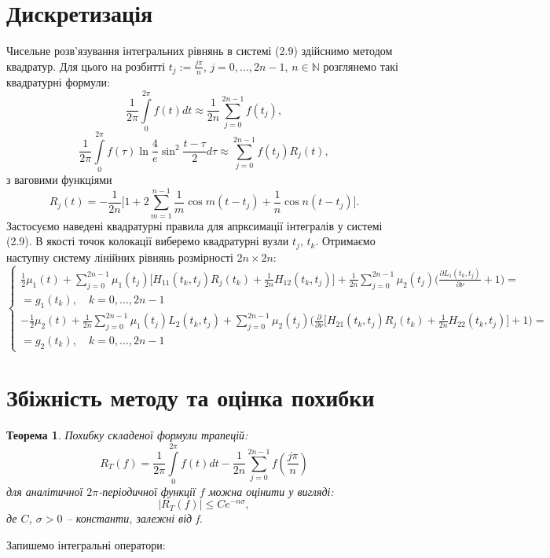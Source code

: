 \documentclass[a4 paper,12pt,ukrainian]{report}
\newtheorem{theorem}{\textbf{Теорема}}[chapter]
\begin{document}
\section{Дискретизація}
\hspace*{\parindent}Чисельне розв'язування інтегральних рівнянь в системі (2.9) здійснимо методом квадратур. Для цього на розбитті $t_{j}:=\frac{j\pi}{n}$, $j=0,...,2n-1$, $n\in\mathbb{N}$ розглянемо такі квадратурні формули:
\begin{equation*}
\displaystyle
\frac{1}{2\pi}\int\limits_{0}^{2\pi}f(t)dt\approx
\frac{1}{2n}\sum\limits_{j=0}^{2n-1}f(t_{j}),
\end{equation*}
\begin{equation*}
\displaystyle
\frac{1}{2\pi}\int\limits_{0}^{2\pi}f(\tau)\ln{\frac{4}{e}\sin^2\frac{t-\tau}{2}}d\tau\approx\sum\limits_{j=0}^{2n-1}f(t_{j})R_{j}(t),
\end{equation*}
з ваговими функціями
\begin{equation*}
\displaystyle
R_{j}(t) = -\frac{1}{2n}\Big[1+2\sum\limits_{m=1}^{n-1}{\frac{1}{m}\cos{m(t-t_{j})}} + \frac{1}{n}\cos{n(t-t_{j})}\Big].
\end{equation*}
\hspace*{\parindent}Застосуємо наведені квадратурні правила для апрксимації інтегралів у системі (2.9). В якості точок колокації виберемо квадратурні вузли $t_{j}$, $t_{k}$. Отримаємо наступну систему лінійних рівнянь розмірності $2n\times 2n$:
\begin{equation}
\left\{
\begin{array}{c}
\displaystyle
\frac{1}{2}\mu_1(t) + \sum\limits_{j=0}^{2n-1} \mu_1(t_j)\Big[H_{11}(t_k,t_j)R_j(t_k)+\frac{1}{2n}H_{12}(t_k,t_j)\Big]+\frac{1}{2n}\sum\limits_{j=0}^{2n-1} \mu_2(t_j)\bigg(\frac{\partial L_1(t_k,t_j)}{\partial \nu} + 1\bigg)=\\
\displaystyle
=g_1(t_k), \quad k=0,...,2n-1\\
\displaystyle
-\frac{1}{2}\mu_2(t) + \frac{1}{2n}\sum\limits_{j=0}^{2n-1} \mu_1(t_j)L_2(t_k,t_j)+\sum\limits_{j=0}^{2n-1} \mu_2(t_j)\bigg(\frac{\partial}{\partial \nu}\Big[H_{21}(t_k,t_j)R_j(t_k)+\frac{1}{2n}H_{22}(t_k,t_j)\Big] + 1 \bigg)=\\
\displaystyle
=g_2(t_k), \quad k=0,...,2n-1
\end{array}
\right.
\end{equation}
\section*{Збіжність методу та оцінка похибки}
\begin{theorem}
Похибку складеної формули трапецій:
\begin{equation*}
R_{T}(f)=\frac{1}{2\pi}\int\limits_{0}^{2\pi}f(t)dt-\frac{1}{2n}\sum\limits_{j=0}^{2n-1}f(\frac{j\pi}{n})
\end{equation*}
для аналітичної $2\pi$-періодичної функції $f$ можна оцінити у вигляді:
\begin{equation*}
|R_{T}(f)|\le Ce^{-n\sigma},
\end{equation*}
де $C$, $\sigma>0$ -- константи, залежні від f. 
\end{theorem}
\hspace*{\parindent}Запишемо інтегральні оператори:
\end{document}
